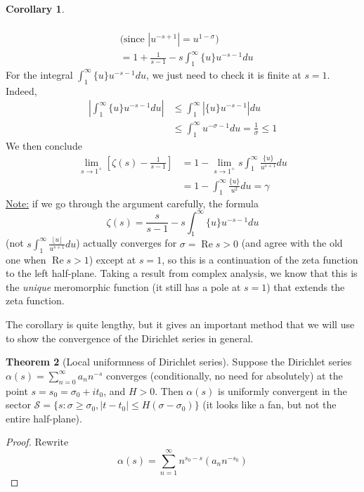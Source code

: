 \documentclass{article}
\theoremstyle{definition}
\newtheorem{theorem}{Theorem}[section]
\newtheorem{corollary}[theorem]{Corollary}
\begin{document}
\begin{shaded}
\begin{corollary}
\begin{enumerate}
\begin{enumerate}
\begin{align*}
		\\
		& \mbox{(since $|u^{-s+1}| = u^{1-\sigma}$)}
		\\
		& = 1 + \frac{1}{s - 1} - s \int_1^\infty \{ u \} u^{-s-1} du
		\end{align*}
		For the integral $\int_1^\infty \{ u \} u^{-s-1} du$, we just need to check it is finite at $s = 1$. Indeed,
		\begin{align*}
		\left| \int_1^\infty \{ u \} u^{-s-1} du \right| & \leq \int_1^\infty \left| \{ u \} u^{-s-1} \right| du
		\\
		& \leq \int_1^\infty u^{-\sigma-1} du = \frac{1}{\sigma} \leq 1
		\end{align*}
		We then conclude
		\begin{align*}
		\lim_{s \to 1^+} \left[ \zeta(s) -  \frac{1}{s - 1} \right] & = 1 - \lim_{s \to 1^+} s \int_1^\infty \frac{\{ u \}}{u^{s+1}} du
		\\
		& = 1 - \int_1^\infty \frac{\{ u \}}{u^2} du = \gamma
		\end{align*}
		\underline{Note:} if we go through the argument carefully, the formula
		$$\zeta(s) = \frac{s}{s - 1} - s \int_1^\infty \{ u \} u^{-s-1} du$$
		(not $s \int_1^\infty \frac{\lfloor u \rfloor}{u^{s + 1}} du$) actually converges for $\sigma = \operatorname{Re} s > 0$ (and agree with the old one when $\operatorname{Re} s > 1$) except at $s = 1$, so this is a continuation of the zeta function to the left half-plane. Taking a result from complex analysis, we know that this is the \textit{unique} meromorphic function (it still has a pole at $s = 1$) that extends the zeta function.
	\end{enumerate}
\end{enumerate}
\end{corollary}
The corollary is quite lengthy, but it gives an important method that we will use to show the convergence of the Dirichlet series in general.
\begin{theorem}[Local uniformness of Dirichlet series]
Suppose the Dirichlet series $\alpha(s) = \sum_{n = 0}^\infty a_n n^{-s}$ converges (conditionally, no need for absolutely) at the point $s = s_0 = \sigma_0 + i t_0$, and $H > 0$. Then $\alpha(s)$ is uniformly convergent in the sector $\mathcal{S} = \{ s : \sigma \geq \sigma_0, |t - t_0| \leq H (\sigma - \sigma_0) \}$ (it looks like a fan, but not the entire half-plane).
\end{theorem}
\begin{proof}
Rewrite
$$\alpha(s) = \sum_{n = 1}^\infty n^{s_0-s} \left( a_n n^{-s_0} \right)$$

\end{proof}
\end{shaded}
\end{document}
